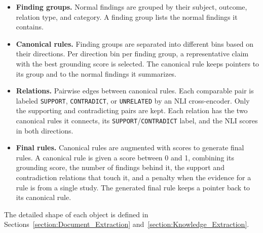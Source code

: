 \begin{itemize}[label={}, leftmargin=1.5em, itemsep=0.4em]
    \item \textbf{Finding groups.} Normal findings are grouped by their subject, outcome, relation type, and category. A finding group lists the normal findings it contains.

    \item \textbf{Canonical rules.} Finding groups are separated into different bins based on their directions. Per direction bin per finding group, a representative claim with the best grounding score is selected. The canonical rule keeps pointers to its group and to the normal findings it summarizes.

    \item \textbf{Relations.} Pairwise edges between canonical rules. Each comparable pair is labeled \texttt{SUPPORT}, \texttt{CONTRADICT}, or \texttt{UNRELATED} by an NLI cross-encoder. Only the supporting and contradicting pairs are kept. Each relation has the two canonical rules it connects, its \texttt{SUPPORT}/\texttt{CONTRADICT} label, and the NLI scores in both directions.

    \item \textbf{Final rules.} Canonical rules are augmented with scores to generate final rules. A canonical rule is given a score between 0 and 1, combining its grounding score, the number of findings behind it, the support and contradiction relations that touch it, and a penalty when the evidence for a rule is from a single study. The generated final rule keeps a pointer back to its canonical rule.
\end{itemize}

The detailed shape of each object is defined in Sections~\ref{section:Document_Extraction} and~\ref{section:Knowledge_Extraction}.